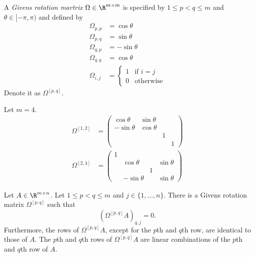 \documentclass[a4paper]{article}
\begin{document}
\begin{definition}
  A \emph{Givens rotation martrix} \(\Omega \in \R^{m \times m}\) is specified by \(1 \leq p < q \leq m\) and \(\theta \in [-\pi, \pi)\) and defined by
  \begin{align*}
    \Omega_{p, p} &= \cos \theta \\
    \Omega_{p, q} &= \sin \theta \\
    \Omega_{q, p} &= -\sin \theta \\
    \Omega_{q, q} &= \cos \theta \\
    \Omega_{i, j} &=
                    \begin{cases}
                      1 & \text{if } i = j \\
                      0 & \text{otherwise}
                    \end{cases}
  \end{align*}
  Denote it as \(\Omega^{[p, q]}\).
\end{definition}

\begin{eg}
  Let \(m = 4\).
  \begin{align*}
    \Omega^{[1, 2]} &=
    \begin{pmatrix}
      \cos \theta & \sin \theta \\
      -\sin \theta & \cos \theta \\
      & & 1 \\
      & & & 1
    \end{pmatrix}
    \\
    \Omega^{[2, 4]} &=
    \begin{pmatrix}
      1 \\
      & \cos \theta & & \sin \theta \\
      & & 1 & \\
      & - \sin \theta & & \sin \theta
    \end{pmatrix}
  \end{align*}
\end{eg}

\blindtext

\begin{theorem}
  Let \(A \in \R^{m \times n}\). Let \(1 \leq p < q \leq m\) and \(j \in \{1, \dots, n\}\). There is a Givens rotation matrix \(\Omega^{[p, q]}\) such that
  \[
    (\Omega^{[p, q]}A)_{q, j} = 0.
  \]
  Furthermore, the rows of \(\Omega^{[p, q]}A\), except for the \(p\)th and \(q\)th row, are identical to those of \(A\). The \(p\)th and \(q\)th rows of \(\Omega^{[p, q]}A\) are linear combinations of the \(p\)th and \(q\)th row of \(A\).
\end{theorem}
\end{document}
